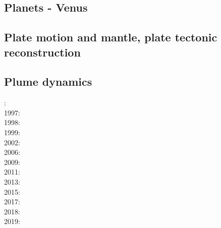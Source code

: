\subsection*{Planets - Venus}

\cite{scbg90}
\cite{kiha92}
\cite{somo96}
\cite{mazk98}\cite{moso98}
\cite{vavv05}
\cite{arta12}
\cite{gita14}
\cite{gery14b}
\cite{cram17}\cite{dast17}
\cite{king18}



\subsection*{Plate motion and mantle, plate tectonic reconstruction}

\noindent
\cite{mcse73}
\cite{zieg92a}
\cite{zhgm98}
\cite{evan03}\cite{reta03}
\cite{lizh09}\cite{vasv09}
\cite{huss12}\cite{gutz12}
\cite{mosq13}
\cite{yoha15}
\cite{tewg19}

\subsection*{Plume dynamics}

: \cite{nasf94}\cite{hayu94}\\
1997: \cite{vank97}\\
1998: \cite{thta98}\\
1999: \cite{lays99}\\
2002: \cite{falt02}\\
2006: \cite{isst06}\cite{liva06a}\cite{liva06b}\cite{zhon06}\cite{mita06}\cite{nokm06}\\
2009: \cite{vavl09}\\
2011: \cite{toyu11}\cite{talz11}\cite{burk11}\cite{memm11}\cite{dalt11}\\
2013: \cite{dagm13}\cite{madd13}\cite{ande13}\\
2015: \cite{daso15}\cite{hafg15}\\
2017: \cite{zhli17}\\
2018: \cite{dacc18}\\
2019: \cite{argc19}

